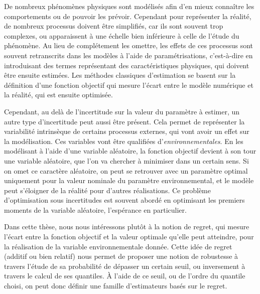 \documentclass[12pt, a4paper]{article}
\begin{document}
De nombreux phénomènes physiques sont modélisés afin d'en mieux
connaître les comportements ou de pouvoir les prévoir. Cependant pour
représenter la réalité, de nombreux processus doivent être simplifiés,
car ils sont souvent trop complexes, ou apparaissent à une échelle
bien inférieure à celle de l'étude du phénomène. Au lieu de
complétement les omettre, les effets de ces processus sont souvent
retranscrits dans les modèles à l'aide de paramétrisations,
c'est-à-dire en introduisant des termes représentant des
caractéristiques physiques, qui doivent être ensuite estimées. Les
méthodes classiques d'estimation se basent sur la définition d'une
fonction objectif qui mesure l'écart entre le modèle numérique et la
réalité, qui est ensuite optimisée. %

Cependant, au delà de l'incertitude sur la valeur du paramètre à
estimer, un autre type d'incertitude peut aussi être présent. Cela
permet de représenter la variabilité intrinsèque de certains processus
externes, qui vont avoir un effet sur la modélisation. Ces variables
vont être qualifiées d'\emph{environnementales}. En les %
modélisant à l'aide d'une variable aléatoire, la fonction objectif
devient à son tour une variable aléatoire, que l'on va chercher à
minimiser dans un certain sens. Si on omet ce caractère aléatoire, on
peut se retrouver avec un paramètre optimal uniquement pour la valeur
nominale du paramètre environnemental, et le modèle peut s'éloigner de
la réalité pour d'autres réalisations. Ce problème d'optimisation sous
incertitudes est souvent abordé en optimisant les premiers moments de
la variable aléatoire, l'espérance en particulier.

Dans cette thèse, nous nous intéressons plutôt à la notion de regret,
qui mesure l'écart entre la fonction objectif et la valeur optimale
qu'elle peut atteindre, pour la réalisation de la variable
environnementale donnée. Cette idée de regret (additif ou bien
relatif) nous permet de proposer une notion de robustesse à travers
l'étude de sa probabilité de dépasser un certain seuil, ou inversement
à travers le calcul de ses quantiles. À l'aide de ce seuil, ou de
l'ordre du quantile choisi, on peut donc définir une famille
d'estimateurs basés sur le regret.
\end{document}

